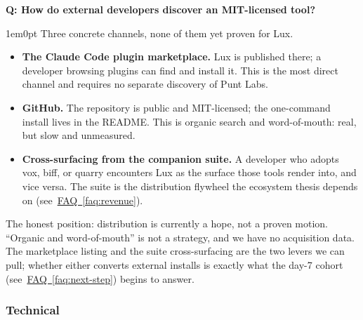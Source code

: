 \documentclass[11pt,letterpaper]{article}
\newcounter{faqnum}
\newenvironment{faqpair}[1]{%
  \needspace{4\baselineskip}%
  \vspace{0.5em}%
  \refstepcounter{faqnum}%
  \noindent\textbf{\color{SectionBlue}Q\thefaqnum: #1}\par\nopagebreak[4]%
  \vspace{0.2em}%
  \begin{adjustwidth}{1em}{0pt}%
  \setlength{\parindent}{0pt}%
}{%
  \end{adjustwidth}%
  \vspace{0.5em}%
}
\newcommand{\faqref}[1]{\hyperref[#1]{FAQ~\ref*{#1}}}
\begin{document}
\begin{faqpair}{How do external developers discover an MIT-licensed tool?}\label{faq:acquisition}
  Three concrete channels, none of them yet proven for Lux.

  \begin{itemize}[nosep]
    \item \textbf{The Claude Code plugin marketplace.} Lux is published there; a
      developer browsing plugins can find and install it. This is the most direct
      channel and requires no separate discovery of Punt Labs.
    \item \textbf{GitHub.} The repository is public and MIT-licensed; the
      one-command install lives in the README. This is organic search and
      word-of-mouth: real, but slow and unmeasured.
    \item \textbf{Cross-surfacing from the companion suite.} A developer who
      adopts vox, biff, or quarry encounters Lux as the surface those tools
      render into, and vice versa. The suite is the distribution flywheel the
      ecosystem thesis depends on (see~\faqref{faq:revenue}).
  \end{itemize}

  The honest position: distribution is currently a hope, not a proven motion.
  ``Organic and word-of-mouth'' is not a strategy, and we have no acquisition
  data. The marketplace listing and the suite cross-surfacing are the two levers
  we can pull; whether either converts external installs is exactly what
  the day-7 cohort (see~\faqref{faq:next-step}) begins to answer.
\end{faqpair}

\subsubsection*{Technical}
\end{document}
